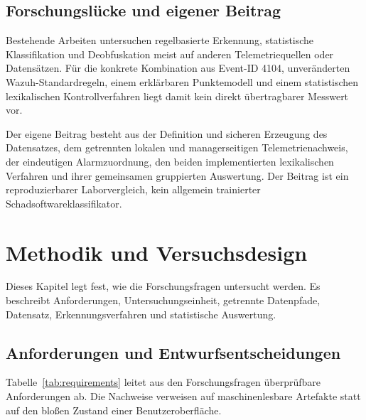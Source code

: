 \documentclass[12pt,a4paper,oneside,parskip=half]{scrreprt}
\begin{document}
\section{Forschungslücke und eigener Beitrag}
Bestehende Arbeiten untersuchen regelbasierte Erkennung, statistische Klassifikation und Deobfuskation meist auf anderen Telemetriequellen oder Datensätzen. Für die konkrete Kombination aus Event-ID 4104, unveränderten Wazuh-Standardregeln, einem erklärbaren Punktemodell und einem statistischen lexikalischen Kontrollverfahren liegt damit kein direkt übertragbarer Messwert vor.

Der eigene Beitrag besteht aus der Definition und sicheren Erzeugung des Datensatzes, dem getrennten lokalen und managerseitigen Telemetrienachweis, der eindeutigen Alarmzuordnung, den beiden implementierten lexikalischen Verfahren und ihrer gemeinsamen gruppierten Auswertung. Der Beitrag ist ein reproduzierbarer Laborvergleich, kein allgemein trainierter Schadsoftwareklassifikator.
\chapter{Methodik und Versuchsdesign}

Dieses Kapitel legt fest, wie die Forschungsfragen untersucht werden. Es beschreibt Anforderungen, Untersuchungseinheit, getrennte Datenpfade, Datensatz, Erkennungsverfahren und statistische Auswertung.

\section{Anforderungen und Entwurfsentscheidungen}
Tabelle~\ref{tab:requirements} leitet aus den Forschungsfragen überprüfbare Anforderungen ab. Die Nachweise verweisen auf maschinenlesbare Artefakte statt auf den bloßen Zustand einer Benutzeroberfläche.
\end{document}
